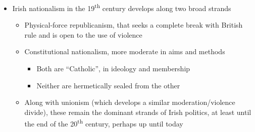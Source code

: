 \documentclass[12pt]{article}
\def\th{\textsuperscript{th}}
\begin{document}
\begin{itemize}
\begin{itemize}
\begin{itemize}
                    \end{itemize}
                \end{itemize}
                \item Irish nationalism in the 19\th{} century develops along two broad strands
                \begin{itemize}
                    \item Physical-force republicanism, that seeks a complete break with British rule and is open to the use of violence
                    \item Constitutional nationalism, more moderate in aims and methods
                    \begin{itemize}
                        \item Both are ``Catholic'', in ideology and membership
                        \item Neither are hermetically sealed from the other
                    \end{itemize}
                    \item Along with unionism (which develops a similar moderation/violence divide), these remain the dominant strands of Irish politics, at least until the end of the 20\th{} century, perhaps up until today
                \end{itemize}
            \end{itemize}
            \newpage
\end{document}
